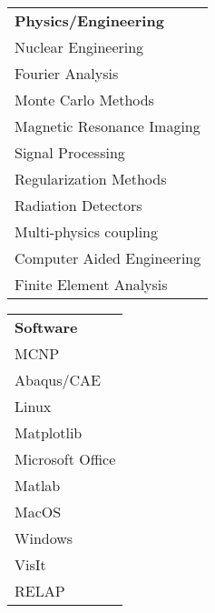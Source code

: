 \\[2mm]
\begin{minipage}{0.32\textwidth}
\begin{tabular}{l}
	{\large\textbf{Physics/Engineering}} \\
	\highskillbw Nuclear Engineering \\
	\highskillbw Fourier Analysis \\ 
	\highskillbw Monte Carlo Methods \\
	\highskillbw Magnetic Resonance Imaging \\ 
	\medskillbw Signal Processing \\
	\medskillbw Regularization Methods  \\
	\medskillbw Radiation Detectors \\
	\lowskillbw Multi-physics coupling \\
	\lowskillbw Computer Aided Engineering \\
	\lowskillbw Finite Element Analysis \\
\end{tabular}
\end{minipage}%
\begin{minipage}{0.2\textwidth}
	\begin{center}
\begin{tabular}{l}
	{\large\textbf{Software}} \\
	\highskillbw \textsc{MCNP} \\
	\highskillbw Abaqus/CAE \\
	\highskillbw Linux \\ 
	\highskillbw Matplotlib \\ 
	\highskillbw Microsoft Office \\
	\highskillbw Matlab \\
	\highskillbw MacOS \\
	\medskillbw Windows \\
	\lowskillbw VisIt \\
	\lowskillbw RELAP
\end{tabular}
	\end{center}
\end{minipage}%
